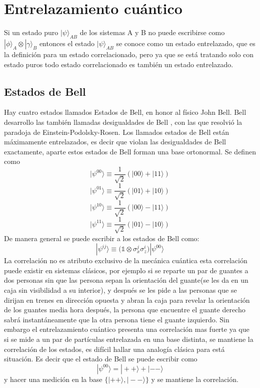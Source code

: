\documentclass[a4paper]{article}
\begin{document}
\section{Entrelazamiento cuántico}
Si un estado  puro $|\psi\rangle_{AB}$ de los sistemas A y B no puede escribirse como $|\phi\rangle_A\otimes |\gamma\rangle_B$ entonces el estado $|\psi\rangle_{AB}$ se conoce como un estado entrelazado, que es la definición para un estado correlacionado, pero ya que se está tratando solo con estado puros todo estado correlacionado es también un estado entrelazado.
\subsection{Estados de Bell}
Hay cuatro estados llamados Estados de Bell, en honor al físico John Bell. Bell desarrollo las también llamadas desigualdades de Bell \cite{Bell}, con las que resolvió la paradoja de Einstein-Podolsky-Rosen. Los llamados estados de Bell están máximamente entrelazados, es decir que violan las desigualdades de Bell exactamente, aparte estos estados de Bell forman una base ortonormal. Se definen como
\begin{equation}\label{eq::bell1}
|\psi^{00}\rangle\equiv \frac{1}{\sqrt{2}}(|00\rangle+|11\rangle)
\end{equation}
\begin{equation}\label{eq::bell2}
|\psi^{01}\rangle\equiv \frac{1}{\sqrt{2}}(|01\rangle+|10\rangle)
\end{equation}
\begin{equation}\label{eq::bell3}
|\psi^{10}\rangle\equiv \frac{1}{\sqrt{2}}(|00\rangle-|11\rangle)
\end{equation}
\begin{equation}\label{eq::bell4}
|\psi^{11}\rangle\equiv \frac{1}{\sqrt{2}}(|01\rangle-|10\rangle)
\end{equation}
De manera general se puede escribir a los estados de Bell como:
\begin{equation}
|\psi^{ij}\rangle\equiv \big( \mathbb{1}\otimes\sigma_x^j \sigma_z^i \big)|\psi^{00}\rangle
\end{equation}
La correlación no es atributo exclusivo de la mecánica cuántica esta correlación puede existir en sistemas clásicos, por ejemplo si se reparte un par de guantes a dos personas sin que las persona sepan la orientación del guante(se les da en un caja sin visibilidad a su interior), y después se les pide a las personas que se dirijan en trenes en dirección opuesta y abran la caja para revelar la orientación de los guantes media hora después, la persona que encuentre el guante derecho sabrá instantáneamente que la otra persona tiene el guante izquierdo. Sin embargo el entrelazamiento cuántico presenta una correlación mas fuerte ya que si se mide a un par de partículas entrelazada en una base distinta, se mantiene la correlación de los estados, es difícil hallar una analogía clásica para está situación. Es decir que el estado de Bell se puede escribir como
\begin{equation}
|\psi^{00}\rangle=|++\rangle+|--\rangle
\end{equation}
y hacer una medición en la base $\{|++\rangle,|--\rangle\}$ y se mantiene la correlación.
\end{document}
